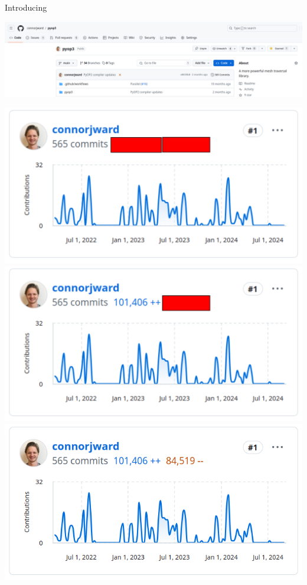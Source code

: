 \documentclass[aspectratio=169]{beamer}
\begin{document}
\begin{frame}{Introducing }
  \vspace{-2em}
  \begin{center}
    \includegraphics[width=\textwidth]{pyop3_github.png}
  \end{center}

  \begin{overprint}
    \centering\includegraphics[width=.5\textwidth]{pyop3_github_stats_hidden.png}
    \centering\includegraphics[width=.5\textwidth]{pyop3_github_stats_partial.png}
    \centering\includegraphics[width=.5\textwidth]{pyop3_github_stats_full.png}
  \end{overprint}
\end{frame}
\end{document}
